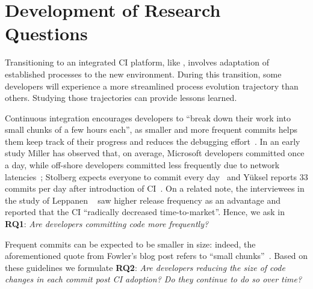 
\section{Development of Research Questions}
\label{sec:background}

Transitioning to an integrated CI platform, like \Tvi, involves adaptation 
of established processes to the new environment. 
During this transition, some developers will experience a more streamlined 
process evolution trajectory than others. 
Studying those trajectories can provide lessons learned.


%


Continuous integration encourages developers to ``break down their work 
into small chunks of a few hours each'', as smaller and more frequent commits 
helps them keep track of their progress and reduces the debugging effort~\cite{Fowler,Duvall}. 
In an early study Miller has observed that, on average, Microsoft developers 
committed once a day, while off-shore developers committed less frequently 
due to network latencies~\cite{Miller}; Stolberg expects everyone to commit every 
day~\cite{Stolberg} and Y\"{u}ksel reports 33 commits per day after introduction 
of CI~\cite{Yuksel}. On a related note, the interviewees in the study of 
Leppanen \etal~\cite{Leppanen2015} saw higher release frequency as an
advantage and reported that the CI ``radically decreased time-to-market''. 
Hence, we ask in \textbf{RQ1}: 
\emph{Are developers committing code more frequently?}

Frequent commits can be expected to be smaller in size: indeed, 
 the aforementioned quote from Fowler's blog post refers to ``small chunks''~\cite{Fowler,Duvall}.
Based on these guidelines we formulate \textbf{RQ2}: 
\emph{Are developers reducing the size of code changes in each commit 
post CI adoption? 
Do they continue to do so over time?}

